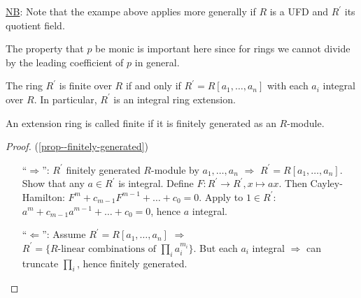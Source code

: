 \documentclass[a4paper,11pt]{article}
\begin{document}
			\noindent\underline{NB}: Note that the exampe above applies more generally if $R$ is a UFD and $R^\prime$ its quotient field.

			\begin{remark}
				The property that $p$ be monic is important here since for rings we cannot divide by the leading coefficient of $p$ in general.
			\end{remark}

			\begin{prop}\label{prop--finitely-generated}
				The ring $R^\prime$ is finite over $R$ if and only if $R^\prime=R[a_1,\dots,a_n]$ with each $a_i$ integral over $R$. In particular, $R^\prime$ is an integral ring extension.
			\end{prop}

			\begin{remark}
				An extension ring is called finite if it is finitely generated as an $R$-module.
			\end{remark}

			\begin{proof}
				(\autoref{prop--finitely-generated}) \begin{enumerate}
					\item [``$\Rightarrow$'':] $R^\prime$ finitely generated $R$-module by $a_1,\dots,a_n$ $\Longrightarrow$ $R^\prime=R[a_1,\dots,a_n]$. Show that any $a\in R^\prime$ is integral. Define $F:R^\prime\rightarrow R^\prime,x\mapsto ax$. Then Cayley-Hamilton: $F^m+c_{m-1}F^{m-1}+\dots+c_0=0$. Apply to $1\in R^\prime$: $a^m+c_{m-1}a^{m-1}+\dots+c_0=0$, hence $a$ integral.
					\item [``$\Leftarrow$'':] Assume $R^\prime=R[a_1,\dots,a_n]$ $\Longrightarrow$ $R^\prime=\{R\text{-linear combinations of }\prod_ia_i^{m_i}\}$. But each $a_i$ integral $\Longrightarrow$ can truncate $\prod_i$, hence finitely generated.
				\end{enumerate}
			\end{proof}
\end{document}
